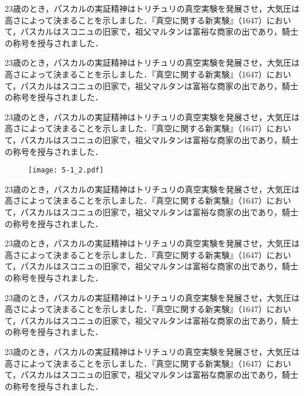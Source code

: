 \begin{定義}
23歳のとき，パスカルの実証精神はトリチュリの真空実験を発展させ，大気圧は高さによって決まることを示しました．『真空に関する新実験』（1647）において，パスカルはスコニュの旧家で，祖父マルタンは富裕な商家の出であり，騎士の称号を授与されました．\end{定義}

\begin{定理}
23歳のとき，パスカルの実証精神はトリチュリの真空実験を発展させ，大気圧は高さによって決まることを示しました．『真空に関する新実験』（1647）において，パスカルはスコニュの旧家で，祖父マルタンは富裕な商家の出であり，騎士の称号を授与されました．\end{定理}
\begin{定理}
23歳のとき，パスカルの実証精神はトリチュリの真空実験を発展させ，大気圧は高さによって決まることを示しました．『真空に関する新実験』（1647）において，パスカルはスコニュの旧家で，祖父マルタンは富裕な商家の出であり，騎士の称号を授与されました．\end{定理}
\begin{figure}[t!]
\centering
\texttt{[image: 5-1\_2.pdf]}
\caption{}\label{fig:C1:02}
\end{figure}

\begin{補題}
23歳のとき，パスカルの実証精神はトリチュリの真空実験を発展させ，大気圧は高さによって決まることを示しました．『真空に関する新実験』（1647）において，パスカルはスコニュの旧家で，祖父マルタンは富裕な商家の出であり，騎士の称号を授与されました．\end{補題}
\begin{補題}
23歳のとき，パスカルの実証精神はトリチュリの真空実験を発展させ，大気圧は高さによって決まることを示しました．『真空に関する新実験』（1647）において，パスカルはスコニュの旧家で，祖父マルタンは富裕な商家の出であり，騎士の称号を授与されました．\end{補題}


\begin{系}
23歳のとき，パスカルの実証精神はトリチュリの真空実験を発展させ，大気圧は高さによって決まることを示しました．『真空に関する新実験』（1647）において，パスカルはスコニュの旧家で，祖父マルタンは富裕な商家の出であり，騎士の称号を授与されました．\end{系}
\begin{系}
23歳のとき，パスカルの実証精神はトリチュリの真空実験を発展させ，大気圧は高さによって決まることを示しました．『真空に関する新実験』（1647）において，パスカルはスコニュの旧家で，祖父マルタンは富裕な商家の出であり，騎士の称号を授与されました．\end{系}

